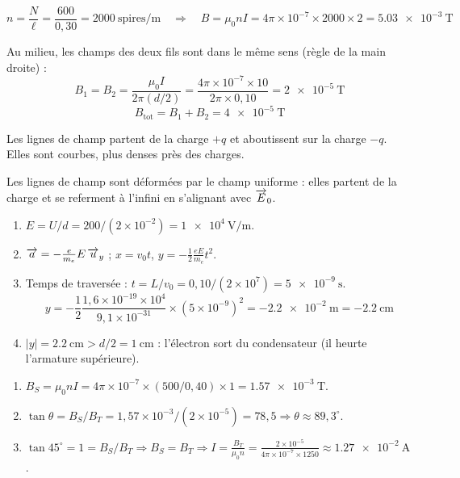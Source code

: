 \[
n = \frac{N}{\ell} = \frac{600}{0,30} = \num{2000}~\mathrm{spires/m} \quad\Rightarrow\quad B = \mu_0 n I = 4\pi\times10^{-7}\times2000\times2 = \SI{5.03e-3}{\tesla}
\]

Au milieu, les champs des deux fils sont dans le même sens (règle de la main droite) :
\[
B_1 = B_2 = \frac{\mu_0 I}{2\pi(d/2)} = \frac{4\pi\times10^{-7}\times10}{2\pi\times0,10} = \SI{2e-5}{\tesla}
\]
\[
B_{\text{tot}} = B_1 + B_2 = \SI{4e-5}{\tesla}
\]

Les lignes de champ partent de la charge $+q$ et aboutissent sur la charge $-q$. Elles sont courbes, plus denses près des charges.

Les lignes de champ sont déformées par le champ uniforme : elles partent de la charge et se referment à l’infini en s’alignant avec $\overrightarrow{E}_0$.

\begin{enumerate}[label=\arabic*)]
\item $E = U/d = 200/(2\times10^{-2}) = \SI{1e4}{\volt\per\metre}$.
\item $\overrightarrow{a} = -\frac{e}{m_e}E\,\overrightarrow{u}_y$ ; $x = v_0 t$, $y = -\frac{1}{2}\frac{eE}{m_e}t^2$.
\item Temps de traversée : $t = L/v_0 = 0,10/(2\times10^7) = \SI{5e-9}{\second}$.
\[
y = -\frac{1}{2}\frac{1,6\times10^{-19}\times10^4}{9,1\times10^{-31}}\times(5\times10^{-9})^2 = -\SI{2.2e-2}{\metre} = -\SI{2.2}{\centi\metre}
\]
\item $|y| = \SI{2.2}{\centi\metre} > d/2 = \SI{1}{\centi\metre}$ : l’électron sort du condensateur (il heurte l’armature supérieure).
\end{enumerate}

\begin{enumerate}[label=\arabic*)]
\item $B_S = \mu_0 n I = 4\pi\times10^{-7}\times(500/0,40)\times1 = \SI{1.57e-3}{\tesla}$.
\item $\tan\theta = B_S/B_T = 1,57\times10^{-3}/(2\times10^{-5}) = 78,5 \Rightarrow \theta \approx 89,3^\circ$.
\item $\tan45^\circ = 1 = B_S/B_T \Rightarrow B_S = B_T \Rightarrow I = \frac{B_T}{\mu_0 n} = \frac{2\times10^{-5}}{4\pi\times10^{-7}\times1250} \approx \SI{1.27e-2}{\ampere}$.
\end{enumerate}

